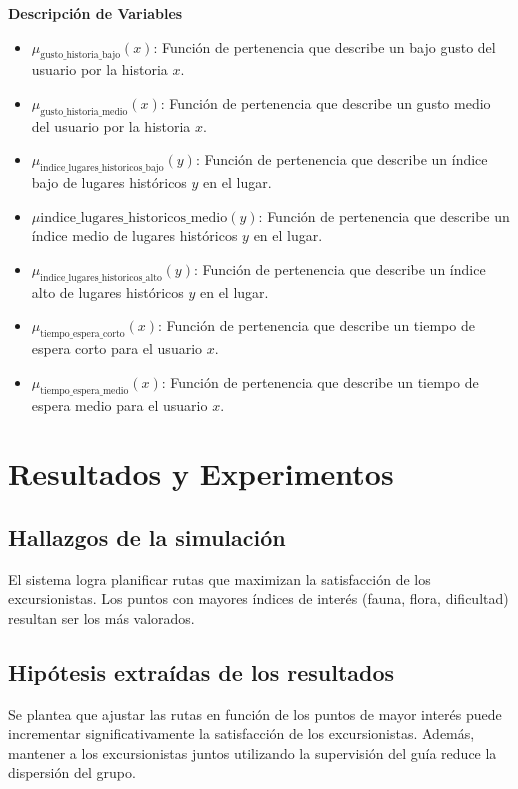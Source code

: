 \documentclass[10pt,twocolumn]{article}
\begin{document}
	
	
	\textbf{Descripción de Variables}
	\begin{itemize}
		\item \(\mu_{\text{gusto\_historia\_bajo}}(x)\): Función de pertenencia que describe un bajo gusto del usuario por la historia \(x\).
		\item \(\mu_{\text{gusto\_historia\_medio}}(x)\): Función de pertenencia que describe un gusto medio del usuario por la historia \(x\).
		\item \(\mu_{\text{indice\_lugares\_historicos\_bajo}}(y)\): Función de pertenencia que describe un índice bajo de lugares históricos \(y\) en el lugar.
		\item \(\mu{\text{indice\_lugares\_historicos\_medio}}(y)\): Función de pertenencia que describe un índice medio de lugares históricos \(y\) en el lugar.
		\item \(\mu_{\text{indice\_lugares\_historicos\_alto}}(y)\): Función de pertenencia que describe un índice alto de lugares históricos \(y\) en el lugar.
		\item \(\mu_{\text{tiempo\_espera\_corto}}(x)\): Función de pertenencia que describe un tiempo de espera corto para el usuario \(x\).
		\item \(\mu_{\text{tiempo\_espera\_medio}}(x)\): Función de pertenencia que describe un tiempo de espera medio para el usuario \(x\).
	\end{itemize}
	
	\section{Resultados y Experimentos}
	
	\subsection{Hallazgos de la simulación}
	El sistema logra planificar rutas que maximizan la satisfacción de los excursionistas. Los puntos con mayores índices de interés (fauna, flora, dificultad) resultan ser los más valorados.
	
	\subsection{Hipótesis extraídas de los resultados}
	Se plantea que ajustar las rutas en función de los puntos de mayor interés puede incrementar significativamente la satisfacción de los excursionistas. Además, mantener a los excursionistas juntos utilizando la supervisión del guía reduce la dispersión del grupo.
	
\end{document}
